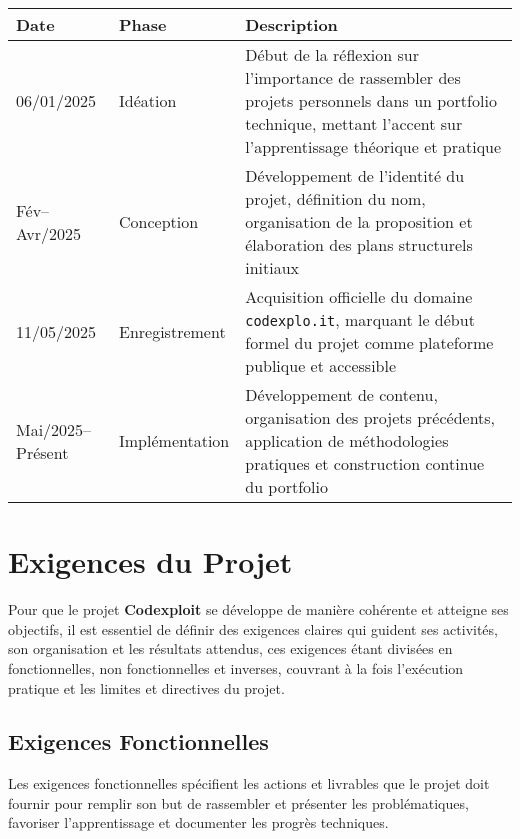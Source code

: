 \documentclass[10pt, a4paper, oneside]{article}
\begin{document}
\begin{table}[ht]
    \centering
    \setlength\tabcolsep{6pt}
    \begin{tabular}{ |l|l|p{6.8cm}| }
        \hline
        \bfseries Date & \bfseries Phase & \bfseries Description \\
        \hline
        06/01/2025 & Idéation & Début de la réflexion sur l’importance de rassembler des projets personnels dans un portfolio technique, mettant l’accent sur l’apprentissage théorique et pratique \\
        \hline
        Fév–Avr/2025 & Conception & Développement de l’identité du projet, définition du nom, organisation de la proposition et élaboration des plans structurels initiaux \\
        \hline
        11/05/2025 & Enregistrement & Acquisition officielle du domaine \texttt{codexplo.it}, marquant le début formel du projet comme plateforme publique et accessible \\
        \hline
        Mai/2025–Présent & Implémentation & Développement de contenu, organisation des projets précédents, application de méthodologies pratiques et construction continue du portfolio \\
        \hline
    \end{tabular}
    \caption{\fontsize{10pt}{11pt}}
    \label{table:history}
\end{table}
\newpage

\section{Exigences du Projet}

Pour que le projet \textbf{Codexploit} se développe de manière cohérente et atteigne ses objectifs, il est essentiel de définir des exigences claires qui guident ses activités, son organisation et les résultats attendus, ces exigences étant divisées en fonctionnelles, non fonctionnelles et inverses, couvrant à la fois l’exécution pratique et les limites et directives du projet.

\subsection{Exigences Fonctionnelles}

Les exigences fonctionnelles spécifient les actions et livrables que le projet doit fournir pour remplir son but de rassembler et présenter les problématiques, favoriser l’apprentissage et documenter les progrès techniques.
\end{document}
